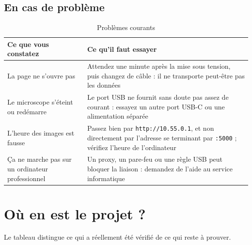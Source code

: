 \documentclass[11pt,a4paper,openany]{report}
\newcommand{\ip}[1]{\texttt{#1}}
\begin{document}
\section{En cas de problème}
\begin{table}[H]
\centering
\caption{Problèmes courants}
\small
\begin{tabularx}{\textwidth}{@{}p{5.2cm}L@{}}
\toprule
Ce que vous constatez & Ce qu'il faut essayer \\
\midrule
La page ne s'ouvre pas & Attendez une minute après la mise sous tension, puis changez de câble : il ne transporte peut-être pas les données \\
Le microscope s'éteint ou redémarre & Le port USB ne fournit sans doute pas assez de courant : essayez un autre port USB-C ou une alimentation séparée \\
L'heure des images est fausse & Passez bien par \ip{http://10.55.0.1}, et non directement par l'adresse se terminant par \ip{:5000} ; vérifiez l'heure de l'ordinateur \\
Ça ne marche pas sur un ordinateur professionnel & Un proxy, un pare-feu ou une règle USB peut bloquer la liaison : demandez de l'aide au service informatique \\
\bottomrule
\end{tabularx}
\end{table}

\chapter{Où en est le projet ?}
\label{chap-etat}

Le tableau distingue ce qui a réellement été vérifié de ce qui reste à prouver.
\end{document}
